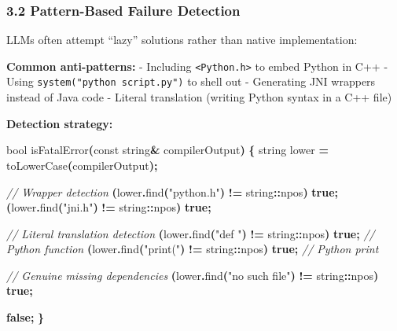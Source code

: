 \documentclass[11pt, a4paper]{article}
\newenvironment{Shaded}{\begin{snugshade}}{\end{snugshade}}
\newcommand{\AttributeTok}[1]{\textcolor[rgb]{0.77,0.63,0.00}{#1}}
\newcommand{\CommentTok}[1]{\textcolor[rgb]{0.56,0.35,0.01}{\textit{#1}}}
\newcommand{\DataTypeTok}[1]{\textcolor[rgb]{0.13,0.29,0.53}{#1}}
\newcommand{\KeywordTok}[1]{\textcolor[rgb]{0.13,0.29,0.53}{\textbf{#1}}}
\newcommand{\NormalTok}[1]{#1}
\newcommand{\OperatorTok}[1]{\textcolor[rgb]{0.81,0.36,0.00}{\textbf{#1}}}
\newcommand{\StringTok}[1]{\textcolor[rgb]{0.31,0.60,0.02}{#1}}
\begin{document}
\subsubsection{3.2 Pattern-Based Failure
Detection}\label{pattern-based-failure-detection}

LLMs often attempt ``lazy'' solutions rather than native implementation:

\textbf{Common anti-patterns:} - Including
\texttt{\textless{}Python.h\textgreater{}} to embed Python in C++ -
Using \texttt{system("python\ script.py")} to shell out - Generating JNI
wrappers instead of Java code - Literal translation (writing Python
syntax in a C++ file)

\textbf{Detection strategy:}

\begin{Shaded}
\begin{Highlighting}[]
\DataTypeTok{bool}\NormalTok{ isFatalError}\OperatorTok{(}\AttributeTok{const}\NormalTok{ string}\OperatorTok{\&}\NormalTok{ compilerOutput}\OperatorTok{)} \OperatorTok{\{}
\NormalTok{    string lower }\OperatorTok{=}\NormalTok{ toLowerCase}\OperatorTok{(}\NormalTok{compilerOutput}\OperatorTok{);}
    
    \CommentTok{// Wrapper detection}
     \OperatorTok{(}\NormalTok{lower}\OperatorTok{.}\NormalTok{find}\OperatorTok{(}\StringTok{"python.h"}\OperatorTok{)} \OperatorTok{!=}\NormalTok{ string}\OperatorTok{::}\NormalTok{npos}\OperatorTok{)}  \KeywordTok{true}\OperatorTok{;}
     \OperatorTok{(}\NormalTok{lower}\OperatorTok{.}\NormalTok{find}\OperatorTok{(}\StringTok{"jni.h"}\OperatorTok{)} \OperatorTok{!=}\NormalTok{ string}\OperatorTok{::}\NormalTok{npos}\OperatorTok{)}  \KeywordTok{true}\OperatorTok{;}
    
    \CommentTok{// Literal translation detection}
     \OperatorTok{(}\NormalTok{lower}\OperatorTok{.}\NormalTok{find}\OperatorTok{(}\StringTok{"def "}\OperatorTok{)} \OperatorTok{!=}\NormalTok{ string}\OperatorTok{::}\NormalTok{npos}\OperatorTok{)}  \KeywordTok{true}\OperatorTok{;}  \CommentTok{// Python function}
     \OperatorTok{(}\NormalTok{lower}\OperatorTok{.}\NormalTok{find}\OperatorTok{(}\StringTok{"print("}\OperatorTok{)} \OperatorTok{!=}\NormalTok{ string}\OperatorTok{::}\NormalTok{npos}\OperatorTok{)}  \KeywordTok{true}\OperatorTok{;} \CommentTok{// Python print}
    
    \CommentTok{// Genuine missing dependencies}
     \OperatorTok{(}\NormalTok{lower}\OperatorTok{.}\NormalTok{find}\OperatorTok{(}\StringTok{"no such file"}\OperatorTok{)} \OperatorTok{!=}\NormalTok{ string}\OperatorTok{::}\NormalTok{npos}\OperatorTok{)}  \KeywordTok{true}\OperatorTok{;}
    
     \KeywordTok{false}\OperatorTok{;}
\OperatorTok{\}}
\end{Highlighting}
\end{Shaded}
\end{document}
